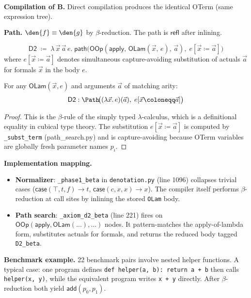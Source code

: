 \textbf{Compilation of B.}
Direct compilation produces the identical OTerm (same expression
tree).

\textbf{Path.}
$\den{f} \equiv \den{g}$ by $\beta$-reduction.  The path is
$\mathsf{refl}$ after inlining.

\begin{definition}
\label{def:d2-path}
\[
  \mathsf{D2} \;\coloneqq\; \lambda\, \vec{x}\, \vec{a}\, e.\;
  \mathsf{path}\!\big(
    \mathsf{OOp}(\mathsf{apply},\,
      \mathsf{OLam}(\vec{x},\, e),\, \vec{a}),\;
    e[\vec{x} \coloneqq \vec{a}]
  \big)
\]
where $e[\vec{x} \coloneqq \vec{a}]$ denotes simultaneous
capture-avoiding substitution of actuals $\vec{a}$ for formals
$\vec{x}$ in the body $e$.
\end{definition}

\begin{theorem}
\label{thm:d2-sound}
For any $\mathsf{OLam}(\vec{x}, e)$ and arguments $\vec{a}$ of
matching arity:
\[
  \mathsf{D2} : \Path\!\big(
    (\lambda \vec{x}.\, e)(\vec{a}),\;
    e[\vec{x} \coloneqq \vec{a}]
  \big)
\]
\end{theorem}

\begin{proof}
This is the $\beta$-rule of the simply typed $\lambda$-calculus,
which is a definitional equality in cubical type theory.  The
substitution $e[\vec{x} \coloneqq \vec{a}]$ is computed by
\texttt{\_subst\_term} (path\_search.py) and is capture-avoiding
because OTerm variables are globally fresh parameter names $p_i$.
\end{proof}

\textbf{Implementation mapping.}
\begin{itemize}
  \item \textbf{Normalizer}: \texttt{\_phase1\_beta} in
    \texttt{denotation.py} (line 1096) collapses trivial cases
    ($\mathsf{case}(\top, t, f) \to t$, $\mathsf{case}(c, x, x) \to x$).
    The compiler itself performs $\beta$-reduction at call sites by
    inlining the stored \texttt{OLam} body.
  \item \textbf{Path search}: \texttt{\_axiom\_d2\_beta}
    (line 221) fires on $\mathsf{OOp}(\mathsf{apply}, \mathsf{OLam}(\ldots), \ldots)$
    nodes.  It pattern-matches the apply-of-lambda form, substitutes
    actuals for formals, and returns the reduced body tagged
    \texttt{D2\_beta}.
\end{itemize}

\textbf{Benchmark example.}
22 benchmark pairs involve nested helper functions.  A typical case:
one program defines \texttt{def helper(a, b): return a + b} then
calls \texttt{helper(x, y)}, while the equivalent program writes
\texttt{x + y} directly.  After $\beta$-reduction both yield
$\mathsf{add}(p_0, p_1)$.


